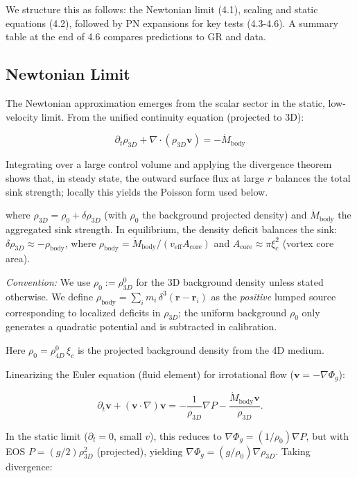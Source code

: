 We structure this as follows: the Newtonian limit (4.1), scaling and static equations (4.2), followed by PN expansions for key tests (4.3-4.6). A summary table at the end of 4.6 compares predictions to GR and data.

\subsection{Newtonian Limit}

The Newtonian approximation emerges from the scalar sector in the static, low-velocity limit. From the unified continuity equation (projected to 3D):

\[
\partial_t \rho_{3D} + \nabla \cdot (\rho_{3D} \mathbf{v}) = -\dot{M}_{\text{body}}
\]

Integrating over a large control volume and applying the divergence theorem shows that, in steady state, the outward surface flux at large $r$ balances the total sink strength; locally this yields the Poisson form used below.

where $\rho_{3D} = \rho_0 + \delta \rho_{3D}$ (with $\rho_0$ the background projected density) and $\dot{M}_{\text{body}}$ the aggregated sink strength. In equilibrium, the density deficit balances the sink: $\delta \rho_{3D} \approx -\rho_{\text{body}}$, where $\rho_{\text{body}} = \dot{M}_{\text{body}} / (v_{\text{eff}} A_{\text{core}})$ and $A_{\text{core}} \approx \pi \xi_c^2$ (vortex core area).

\noindent\textit{Convention:} We use $\rho_0 := \rho_{3D}^0$ for the 3D background density unless stated otherwise.
We define $\rho_{\text{body}} = \sum_i m_i \, \delta^3(\mathbf r - \mathbf r_i)$ as the \emph{positive} lumped source corresponding to localized deficits in $\rho_{3D}$; the uniform background $\rho_0$ only generates a quadratic potential and is subtracted in calibration.

Here $\rho_0 = \rho_{4D}^0 \, \xi_c$ is the projected background density from the 4D medium.

Linearizing the Euler equation (fluid element) for irrotational flow ($\mathbf{v} = -\nabla \Phi_g$):

\[
\partial_t \mathbf{v} + (\mathbf{v} \cdot \nabla) \mathbf{v} = -\frac{1}{\rho_{3D}} \nabla P - \frac{\dot{M}_{\text{body}} \mathbf{v}}{\rho_{3D}}.
\]

In the static limit ($\partial_t = 0$, small $v$), this reduces to $\nabla \Phi_g = (1 / \rho_0) \nabla P$, but with EOS $P = (g / 2) \rho_{3D}^2$ (projected), yielding $\nabla \Phi_g = (g / \rho_0) \nabla \rho_{3D}$. Taking divergence:

